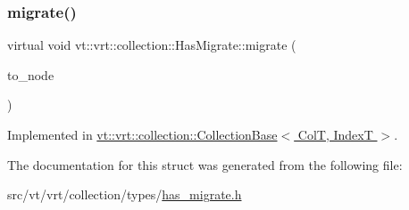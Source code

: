 \subsubsection{\texorpdfstring{migrate()}{migrate()}}
{\footnotesize\ttfamily virtual void vt\+::vrt\+::collection\+::\+Has\+Migrate\+::migrate (\begin{DoxyParamCaption}\item[{\hyperlink{namespacevt_a866da9d0efc19c0a1ce79e9e492f47e2}{Node\+Type} const \&}]{to\+\_\+node }\end{DoxyParamCaption})\hspace{0.3cm}{\ttfamily [pure virtual]}}



Implemented in \hyperlink{structvt_1_1vrt_1_1collection_1_1_collection_base_a34f089d6f08e84b1745a265ad865807a}{vt\+::vrt\+::collection\+::\+Collection\+Base$<$ Col\+T, Index\+T $>$}.



The documentation for this struct was generated from the following file\+:\begin{DoxyCompactItemize}
\item 
src/vt/vrt/collection/types/\hyperlink{has__migrate_8h}{has\+\_\+migrate.\+h}\end{DoxyCompactItemize}
